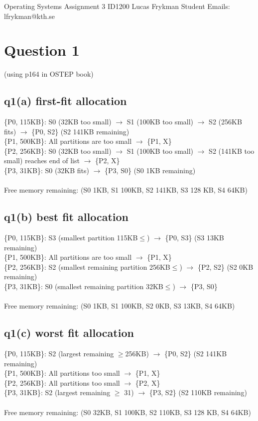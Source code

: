 \documentclass{assignment}
\begin{document}
{Operating Systems}
{Assignment 3}
{ID1200}
{Lucas Frykman}
{Student Emails: lfrykman@kth.se}

\section*{Question 1}
(using p164 in OSTEP book)
\subsection*{q1(a) first-fit allocation}
\{P0, 115KB\}: S0 (32KB too small) $\rightarrow$ S1 (100KB too small) $\rightarrow$ S2 (256KB fits) $\rightarrow$ \{P0, S2\} (S2 141KB remaining)\\
\{P1, 500KB\}: All partitions are too small $\rightarrow$ \{P1, X\} \\
\{P2, 256KB\}: S0  (32KB too small) $\rightarrow$ S1 (100KB too small) $\rightarrow$ S2 (141KB too small) reaches end of list $\rightarrow$ \{P2, X\}  \\
\{P3, 31KB\}: S0 (32KB fits)  $\rightarrow$ \{P3, S0\} (S0 1KB remaining) \\ \\
Free memory remaining: (S0 1KB, S1 100KB, S2 141KB, S3 128 KB, S4 64KB)

\subsection*{q1(b) best fit allocation}
\{P0, 115KB\}: S3 (smallest partition 115KB$\le$) $\rightarrow$ \{P0, S3\} (S3 13KB remaining)\\
\{P1, 500KB\}: All partitions are too small $\rightarrow$ \{P1, X\} \\
\{P2, 256KB\}: S2 (smallest remaining partition 256KB$\le$) $\rightarrow$ \{P2, S2\} (S2 0KB remaining)\\
\{P3, 31KB\}: S0 (smallest remaining partition 32KB$\le$) $\rightarrow$ \{P3, S0\} \\ \\
Free memory remaining: (S0 1KB, S1 100KB, S2 0KB, S3 13KB, S4 64KB)

\subsection*{q1(c) worst fit allocation}
\{P0, 115KB\}: S2 (largest remaining $\ge$256KB) $\rightarrow$ \{P0, S2\} (S2 141KB remaining)\\
\{P1, 500KB\}: All partitions too small $\rightarrow$ \{P1, X\} \\
\{P2, 256KB\}: All partitions too small $\rightarrow$ \{P2, X\}  \\
\{P3, 31KB\}: S2 (largest remaining $\ge$ 31) $\rightarrow$ \{P3, S2\} (S2 110KB remaining) \\ \\
Free memory remaining: (S0 32KB, S1 100KB, S2 110KB, S3 128 KB, S4 64KB)
\end{document}
